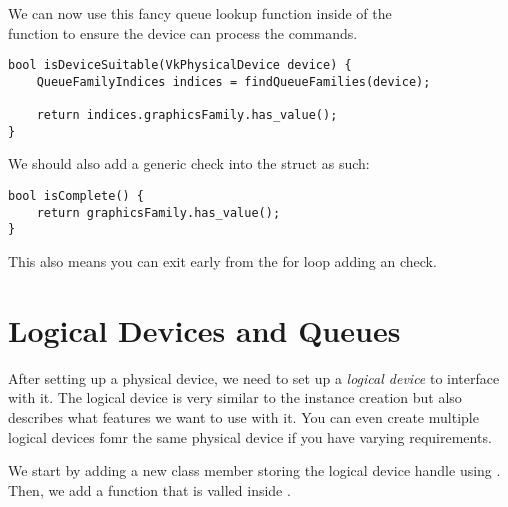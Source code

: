 \par We can now use this fancy queue lookup function inside of the \\  function to ensure the device can process the commands.

\begin{center}
\begin{minipage}{0.95\linewidth}
\begin{lstlisting}
bool isDeviceSuitable(VkPhysicalDevice device) {
    QueueFamilyIndices indices = findQueueFamilies(device);

    return indices.graphicsFamily.has_value();
}    
\end{lstlisting}
\end{minipage}
\end{center}

\par We should also add a generic check into the  struct as such:

\begin{center}
\begin{minipage}{0.95\linewidth}
\begin{lstlisting}
bool isComplete() {
    return graphicsFamily.has_value();
}
\end{lstlisting}
\end{minipage}
\end{center}

\par This also means you can exit early from the for loop adding an  check.

\section*{Logical Devices and Queues}

\par After setting up a physical device, we need to set up a \emph{logical device} to interface with it. The logical device is very similar to the instance creation but also describes what features we want to use with it. You can even create multiple logical devices fomr the same physical device if you have varying requirements. 

\par We start by adding a new class member storing the logical device handle using . Then, we add a  function that is valled inside .

